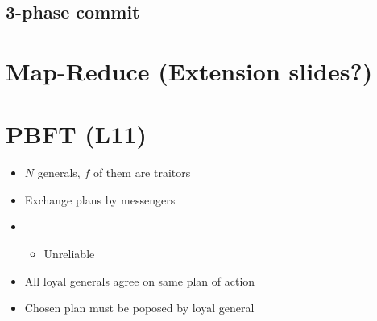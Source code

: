 \documentclass{easyclass}
\begin{document}
\section{3-phase commit}
\chapter{Map-Reduce (Extension slides?)}

\chapter{PBFT (L11)}
\begin{theo}{}
    \begin{itemize}
        \item $N$ generals, $f$ of them are traitors
        \item Exchange plans by messengers
        \item \begin{itemize}
            \item Unreliable %
        \end{itemize}
        \item All loyal generals agree on same plan of action
        \item Chosen plan must be poposed by loyal general
    \end{itemize}
\end{theo}
\end{document}
